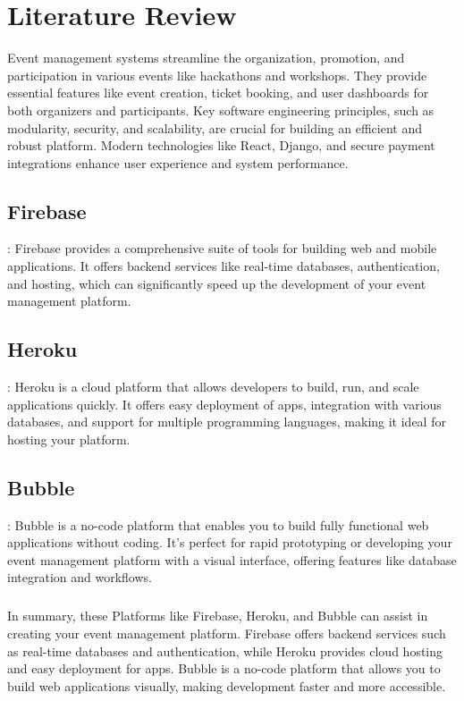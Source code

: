 \documentclass[twoside,a4paper,openright]{report} %
\begin{document}
\paragraph{}


\chapter{Literature Review}
Event management systems streamline the organization, promotion, and participation in various events like hackathons and workshops. They provide essential features like event creation, ticket booking, and user dashboards for both organizers and participants. Key software engineering principles, such as modularity, security, and scalability, are crucial for building an efficient and robust platform. Modern technologies like React, Django, and secure payment integrations enhance user experience and system performance.

\section{\textbf{Firebase}}:
Firebase provides a comprehensive suite of tools for building web and mobile applications. It offers backend services like real-time databases, authentication, and hosting, which can significantly speed up the development of your event management platform.

\section{\textbf{Heroku}}:
Heroku is a cloud platform that allows developers to build, run, and scale applications quickly. It offers easy deployment of apps, integration with various databases, and support for multiple programming languages, making it ideal for hosting your platform.

\section{\textbf{Bubble}}:
Bubble is a no-code platform that enables you to build fully functional web applications without coding. It’s perfect for rapid prototyping or developing your event management platform with a visual interface, offering features like database integration and workflows.
\paragraph{}
In summary, these Platforms like Firebase, Heroku, and Bubble can assist in creating your event management platform. Firebase offers backend services such as real-time databases and authentication, while Heroku provides cloud hosting and easy deployment for apps. Bubble is a no-code platform that allows you to build web applications visually, making development faster and more accessible.
\end{document}

